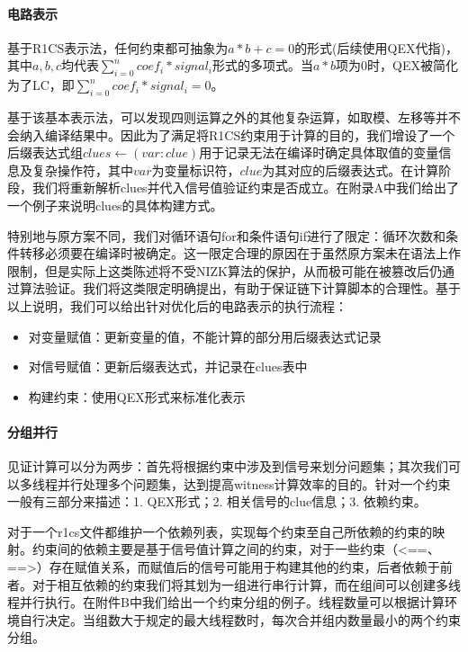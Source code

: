 \paragraph{电路表示} 基于R1CS表示法，任何约束都可抽象为$a*b+c=0$的形式(后续使用QEX代指)，其中$a, b, c$均代表$\sum_{i=0}^{n}coef_i * signal_i$形式的多项式。当$a*b$项为0时，QEX被简化为了LC，即$\sum_{i=0}^{n}coef_i * signal_i = 0$。

基于该基本表示法，可以发现四则运算之外的其他复杂运算，如取模、左移等并不会纳入编译结果中。因此为了满足将R1CS约束用于计算的目的，我们增设了一个后缀表达式组$clues\leftarrow {(var:clue)}$用于记录无法在编译时确定具体取值的变量信息及复杂操作符，其中$var$为变量标识符，$clue$为其对应的后缀表达式。在计算阶段，我们将重新解析clues并代入信号值验证约束是否成立。在附录A中我们给出了一个例子来说明clues的具体构建方式。

特别地与原方案不同，我们对循环语句for和条件语句if进行了限定：循环次数和条件转移必须要在编译时被确定。这一限定合理的原因在于虽然原方案未在语法上作限制，但是实际上这类陈述将不受NIZK算法的保护，从而极可能在被篡改后仍通过算法验证。我们将这类限定明确提出，有助于保证链下计算脚本的合理性。基于以上说明，我们可以给出针对优化后的电路表示的执行流程：
\begin{itemize}
    \setlength{\itemsep}{0pt}
    \setlength{\parsep}{0pt}
    \setlength{\parskip}{0pt}
    \item 对变量赋值：更新变量的值，不能计算的部分用后缀表达式记录
    \item 对信号赋值：更新后缀表达式，并记录在clues表中
    \item 构建约束：使用QEX形式来标准化表示
\end{itemize}

\paragraph{分组并行} 见证计算可以分为两步：首先将根据约束中涉及到信号来划分问题集；其次我们可以多线程并行处理多个问题集，达到提高witness计算效率的目的。针对一个约束一般有三部分来描述：1. QEX形式；2. 相关信号的clue信息；3. 依赖约束。

对于一个r1cs文件都维护一个依赖列表，实现每个约束至自己所依赖的约束的映射。约束间的依赖主要是基于信号值计算之间的约束，对于一些约束（<==、==>）存在赋值关系，而赋值后的信号可能用于构建其他的约束，后者依赖于前者。对于相互依赖的约束我们将其划为一组进行串行计算，而在组间可以创建多线程并行执行。在附件B中我们给出一个约束分组的例子。线程数量可以根据计算环境自行决定。当组数大于规定的最大线程数时，每次合并组内数量最小的两个约束分组。

